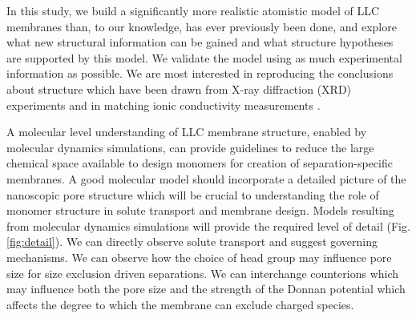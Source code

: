 \documentclass{article}
\begin{document}
  In this study, we build a significantly more realistic atomistic model of LLC
  membranes than, to our knowledge, has ever previously been done, and explore
  what new structural information can be gained and what structure hypotheses are
  supported by this model. We validate the model using as much experimental
  information as possible. We are most interested in reproducing the conclusions
  about structure which have been drawn from X-ray diffraction (XRD) experiments
  and in matching ionic conductivity measurements \cite{feng_thin_2016}.

  A molecular level understanding of LLC membrane structure, enabled by
  molecular dynamics simulations, can provide guidelines to reduce the large
  chemical space available to design monomers for creation of separation-specific
  membranes. A good molecular model should incorporate a detailed picture of the
  nanoscopic pore structure which will be crucial to understanding the role of
  monomer structure in solute transport and membrane design. Models resulting
  from molecular dynamics simulations will provide the required level of detail
  (Fig. \ref{fig:detail}).  We can directly observe solute transport and suggest
  governing mechanisms. We can observe how the choice of head group may influence
  pore size for size exclusion driven separations. We can interchange counterions
  which may influence both the pore size and the strength of the Donnan potential
  which affects the degree to which the membrane can exclude charged species. 
\end{document}
